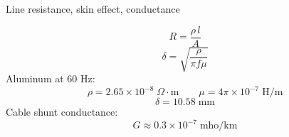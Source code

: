 Line resistance, skin effect, conductance

$$R=\frac{\rho\,l}{A}$$
$$\delta=\sqrt{\frac{\rho}{\pi f\mu}}$$
Aluminum at 60 Hz:
$$\rho=2.65\times10^{-8}\;\Omega\cdot\text{m}\qquad \mu=4\pi\times10^{-7}\;\text{H/m}$$
$$\delta=10.58\;\text{mm}$$
Cable shunt conductance:
$$G\approx0.3\times10^{-7}\;\text{mho/km}$$
